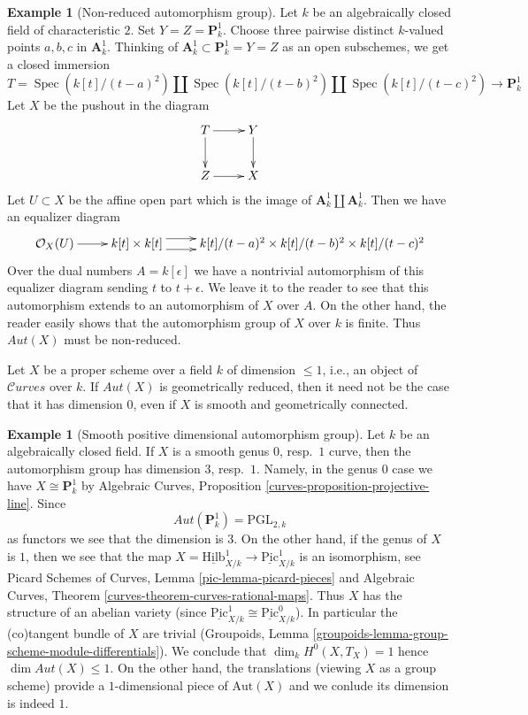 \documentclass{stacks-project}
\theoremstyle{plain}
\theoremstyle{definition}
\newtheorem{example}[subsection]{Example}
\theoremstyle{remark}
\numberwithin{equation}{subsection}
\def\Spec{\mathop{\mathrm{Spec}}}
\def\Hilbfunctor{\mathrm{Hilb}}
\def\Curvesstack{\mathcal{C}\!\mathit{urves}}
\def\Picardfunctor{\mathrm{Pic}}
\begin{document}
\begin{example}[Non-reduced automorphism group]
\label{example-non-reduced}
Let $k$ be an algebraically closed field of characteristic $2$.
Set $Y = Z = \mathbf{P}^1_k$. Choose three pairwise distinct $k$-valued points
$a, b, c$ in $\mathbf{A}^1_k$. Thinking of
$\mathbf{A}^1_k \subset \mathbf{P}^1_k = Y = Z$ as an open subschemes,
we get a closed immersion
$$
T =  \Spec(k[t]/(t - a)^2) \amalg \Spec(k[t]/(t - b)^2)
\amalg \Spec(k[t]/(t - c)^2)
\longrightarrow
\mathbf{P}^1_k
$$
Let $X$ be the pushout in the diagram
$$
\xymatrix{
T \ar[r] \ar[d] & Y \ar[d] \\
Z \ar[r] & X
}
$$
Let $U \subset X$ be the affine open part which is the image of
$\mathbf{A}^1_k \amalg \mathbf{A}^1_k$. Then we have an equalizer
diagram
$$
\xymatrix{
\mathcal{O}_X(U) \ar[r] &
k[t] \times k[t] \ar@<1ex>[r] \ar@<-1ex>[r] &
k[t]/(t - a)^2 \times k[t]/(t - b)^2 \times k[t]/(t - c)^2
}
$$
Over the dual numbers $A = k[\epsilon]$ we have a nontrivial automorphism
of this equalizer diagram sending $t$ to $t + \epsilon$. We leave it to the
reader to see that this automorphism extends to an automorphism of $X$
over $A$. On the other hand, the reader easily shows that the
automorphism group of $X$ over $k$ is finite.
Thus $\mathit{Aut}(X)$ must be non-reduced.
\end{example}

\noindent
Let $X$ be a proper scheme over a field $k$ of dimension $\leq 1$, i.e.,
an object of $\Curvesstack$ over $k$. If $\mathit{Aut}(X)$
is geometrically reduced, then it need not be the case that
it has dimension $0$, even if $X$ is smooth and geometrically connected.

\begin{example}[Smooth positive dimensional automorphism group]
\label{example-pos-dim}
Let $k$ be an algebraically closed field. If $X$ is a smooth
genus $0$, resp.\ $1$ curve, then the automorphism group has
dimension $3$, resp.\ $1$. Namely, in the genus $0$ case we have
$X \cong \mathbf{P}^1_k$ by Algebraic Curves, Proposition
\ref{curves-proposition-projective-line}. Since
$$
\mathit{Aut}(\mathbf{P}^1_k) = \text{PGL}_{2, k}
$$
as functors we see that the dimension is $3$. On the other hand,
if the genus of $X$ is $1$, then we see that the map
$X = \underline{\Hilbfunctor}^1_{X/k} \to
\underline{\Picardfunctor}^1_{X/k}$ is an isomorphism, see
Picard Schemes of Curves, Lemma \ref{pic-lemma-picard-pieces}
and
Algebraic Curves, Theorem \ref{curves-theorem-curves-rational-maps}.
Thus $X$ has the structure of an abelian variety
(since $\underline{\Picardfunctor}^1_{X/k} \cong
\underline{\Picardfunctor}^0_{X/k}$).
In particular the (co)tangent bundle of $X$ are trivial
(Groupoids, Lemma \ref{groupoids-lemma-group-scheme-module-differentials}).
We conclude that $\dim_k H^0(X, T_X) = 1$ hence
$\dim \mathit{Aut}(X) \leq 1$. On the other hand, the translations
(viewing $X$ as a group scheme) provide a $1$-dimensional
piece of $\text{Aut}(X)$ and we conlude its dimension is indeed $1$.
\end{example}
\end{document}

